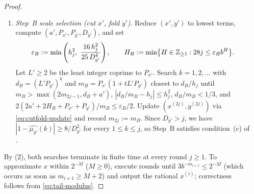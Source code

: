 \documentclass[11pt]{article}
\begin{document}
\begin{proof}
\begin{enumerate}[label=\textup{Step \arabic*.},leftmargin=*,nosep]
\begin{align*}
b^d&\ge jA_y, &
\frac{2(2a+2H_A+P_x+P_y)}{m}&\le\frac{\varepsilon_A}{2}.
\end{align*}
Update $(x',y')$ by \eqref{eq:cutfold-update} with $(C,F)=(y,x)$ and record $m_{2j-1}:=m$. Since $x,y\le2$ and $7k\cdot 2b^{-H_A}\le 14jb^{-H_A}\le\varepsilon_A/2$ for all $1\le k\le j$, (b),(c) and (3)--(4) guarantee that the Fourier coupling error at every $1\le k\le j$ is at most $\varepsilon_A\le\frac{h_j^2}{100}|1-\widehat{\mu_y}(k)|^2$ (whenever $D_y\nmid k$), the mean-distance error is at most $h_j^2$, all selectable prefix errors are at most $h_j$, and \eqref{eq:den-growth} forces $D_{y'}>j$.
\item \emph{Step~B scale selection (cut $x'$, fold $y'$).} Reduce $(x',y')$ to lowest terms, compute $(a',P_{x'},P_{y'},D_{y'})$, and set
\[
\varepsilon_B:=\min\left(h_j^2,\ \frac{16\,h_j^2}{25\,D_{y'}^4}\right),\qquad
H_B:=\min\bigl\{H\in\Z_{\ge1}:28j\le\varepsilon_B b^H\bigr\}.
\]
Let $L'\ge2$ be the least integer coprime to $P_{x'}$. Search $k=1,2,\dots$ with $d_B=(L'P_{y'})^k$ and $m_B=P_{x'}(1+tL'P_{y'})$ closest to $d_B/h_j$ until $m_B>\max(2m_{2j-1},d_B+a')$, $|d_B/m_B-h_j|\le h_j^2$, $d_B/m_B<1/3$, and $2(2a'+2H_B+P_{x'}+P_{y'})/m_B\le\varepsilon_B/2$. Update $(x^{(2j)},y^{(2j)})$ via \eqref{eq:cutfold-update} and record $m_{2j}:=m_B$. Since $D_{y'}>j$, we have $|1-\widehat{\mu_{y'}}(k)|\ge 8/D_{y'}^2$ for every $1\le k\le j$, so Step~B satisfies condition~(c) of .
\end{enumerate}
By (2), both searches terminate in finite time at every round $j\ge1$. To approximate $x$ within $2^{-M}$ ($M\ge0$), execute rounds until $3b^{-m_{i+1}}\le 2^{-M}$ (which occurs as soon as $m_{i+1}\ge M+2$) and output the rational $x^{(i)}$; correctness follows from \eqref{eq:tail-modulus}.
\end{proof}
\end{document}

